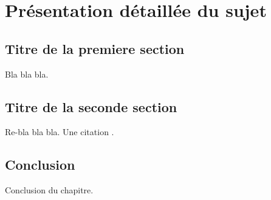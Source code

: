 \chapter{Présentation détaillée du sujet}
\label{chap1}
\section{Titre de la premiere section}
Bla bla bla.
\section{Titre de la seconde section}
Re-bla bla bla.
Une citation \cite{bregier2004mas}.

\section{Conclusion}
Conclusion du chapitre.